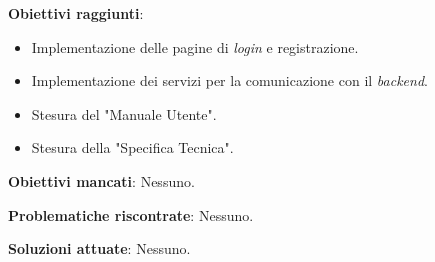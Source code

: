 \textbf{Obiettivi raggiunti}:
\begin{itemize}
	\item Implementazione delle pagine di \textit{login} e registrazione.
	\item Implementazione dei servizi per la comunicazione con il \textit{backend}.
	\item Stesura del "Manuale Utente".
	\item Stesura della "Specifica Tecnica".
\end{itemize}

\textbf{Obiettivi mancati}: Nessuno.

\textbf{Problematiche riscontrate}: Nessuno.

\textbf{Soluzioni attuate}: Nessuno.